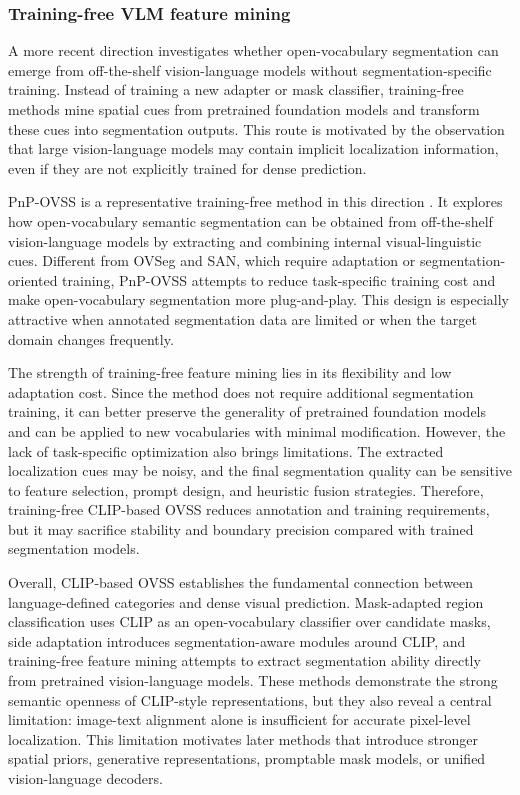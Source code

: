 \subsubsection{Training-free VLM feature mining}

A more recent direction investigates whether open-vocabulary segmentation can emerge from off-the-shelf vision-language models without segmentation-specific training. 
Instead of training a new adapter or mask classifier, training-free methods mine spatial cues from pretrained foundation models and transform these cues into segmentation outputs. 
This route is motivated by the observation that large vision-language models may contain implicit localization information, even if they are not explicitly trained for dense prediction.

PnP-OVSS is a representative training-free method in this direction \cite{Luo2024}. 
It explores how open-vocabulary semantic segmentation can be obtained from off-the-shelf vision-language models by extracting and combining internal visual-linguistic cues. 
Different from OVSeg and SAN, which require adaptation or segmentation-oriented training, PnP-OVSS attempts to reduce task-specific training cost and make open-vocabulary segmentation more plug-and-play. 
This design is especially attractive when annotated segmentation data are limited or when the target domain changes frequently.

The strength of training-free feature mining lies in its flexibility and low adaptation cost. 
Since the method does not require additional segmentation training, it can better preserve the generality of pretrained foundation models and can be applied to new vocabularies with minimal modification. 
However, the lack of task-specific optimization also brings limitations. 
The extracted localization cues may be noisy, and the final segmentation quality can be sensitive to feature selection, prompt design, and heuristic fusion strategies. 
Therefore, training-free CLIP-based OVSS reduces annotation and training requirements, but it may sacrifice stability and boundary precision compared with trained segmentation models.

Overall, CLIP-based OVSS establishes the fundamental connection between language-defined categories and dense visual prediction. 
Mask-adapted region classification uses CLIP as an open-vocabulary classifier over candidate masks, side adaptation introduces segmentation-aware modules around CLIP, and training-free feature mining attempts to extract segmentation ability directly from pretrained vision-language models. 
These methods demonstrate the strong semantic openness of CLIP-style representations, but they also reveal a central limitation: image-text alignment alone is insufficient for accurate pixel-level localization. 
This limitation motivates later methods that introduce stronger spatial priors, generative representations, promptable mask models, or unified vision-language decoders.

